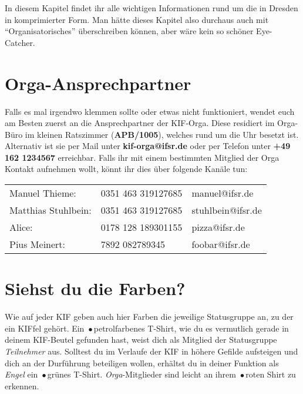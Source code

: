 
In diesem Kapitel findet ihr alle wichtigen Informationen rund um die \KIF{} in Dresden in komprimierter Form.
Man hätte dieses Kapitel also durchaus auch mit ``Organisatorisches'' überschreiben können, aber wäre kein so schöner Eye-Catcher.

\section*{Orga-Ansprechpartner}

Falls es mal irgendwo klemmen sollte oder etwas nicht funktioniert, wendet euch am Besten zuerst an die Ansprechpartner der KIF-Orga.
Diese residiert im Orga-Büro im kleinen Ratszimmer (\textbf{APB/1005}), welches rund um die Uhr besetzt ist.
Alternativ ist sie per Mail unter \textbf{kif-orga@ifsr.de} oder per Telefon unter \textbf{+49 162 1234567} erreichbar.
Falls ihr mit einem bestimmten Mitglied der Orga Kontakt aufnehmen wollt, könnt ihr dies über folgende Kanäle tun:

\vspace{.5cm}

\begin{tabular}{l l l}
Manuel Thieme:      & 0351 463 319127685 & manuel@ifsr.de \\[.05cm]
Matthias Stuhlbein: & 0351 463 319127685 & stuhlbein@ifsr.de \\[.05cm]
Alice:              & 0178 128 189301155 & pizza@ifsr.de \\[.05cm]
Pius Meinert:       & 7892 082789345     & foobar@ifsr.de
\end{tabular}

\section*{Siehst du die Farben?}

Wie auf jeder KIF geben auch hier Farben die jeweilige Statusgruppe an, zu der ein KIFfel gehört.
Ein {\,\color{ShirtAttendee}$\bullet$\,}petrolfarbenes T-Shirt, wie du es vermutlich gerade in deinem KIF-Beutel gefunden hast, weist dich als Mitglied der Statusgruppe \emph{Teilnehmer} aus.
Solltest du im Verlaufe der KIF in höhere Gefilde aufsteigen und dich an der Durführung beteiligen wollen, erhältst du in deiner Funktion als \emph{Engel} ein {\,\color{ShirtAngel}$\bullet$\,}grünes T-Shirt.
\emph{Orga}-Mitglieder sind leicht an ihrem {\,\color{ShirtOrga}$\bullet$\,}roten Shirt zu erkennen.

